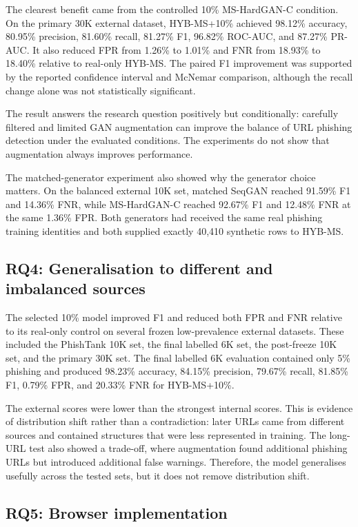 The clearest benefit came from the controlled 10\% MS-HardGAN-C condition. On
the primary 30K external dataset, HYB-MS+10\% achieved 98.12\% accuracy,
80.95\% precision, 81.60\% recall, 81.27\% F1, 96.82\% ROC-AUC, and 87.27\%
PR-AUC. It also reduced FPR from 1.26\% to 1.01\% and FNR from 18.93\% to
18.40\% relative to real-only HYB-MS. The paired F1 improvement was supported
by the reported confidence interval and McNemar comparison, although the
recall change alone was not statistically significant.

The result answers the research question positively but conditionally:
carefully filtered and limited GAN augmentation can improve the balance of URL
phishing detection under the evaluated conditions. The experiments do not show
that augmentation always improves performance.

The matched-generator experiment also showed why the generator choice matters.
On the balanced external 10K set, matched SeqGAN reached 91.59\% F1 and
14.36\% FNR, while MS-HardGAN-C reached 92.67\% F1 and 12.48\% FNR at the
same 1.36\% FPR. Both generators had received the same real phishing training
identities and both supplied exactly 40,410 synthetic rows to HYB-MS.

\subsection{RQ4: Generalisation to different and imbalanced sources}

The selected 10\% model improved F1 and reduced both FPR and FNR relative to
its real-only control on several frozen low-prevalence external datasets. These
included the PhishTank 10K set, the final labelled 6K set, the post-freeze 10K
set, and the primary 30K set. The final labelled 6K evaluation contained only
5\% phishing and produced 98.23\% accuracy, 84.15\% precision, 79.67\% recall,
81.85\% F1, 0.79\% FPR, and 20.33\% FNR for HYB-MS+10\%.

The external scores were lower than the strongest internal scores. This is
evidence of distribution shift rather than a contradiction: later URLs came
from different sources and contained structures that were less represented in
training. The long-URL test also showed a trade-off, where augmentation found
additional phishing URLs but introduced additional false warnings. Therefore,
the model generalises usefully across the tested sets, but it does not remove
distribution shift.

\subsection{RQ5: Browser implementation}

